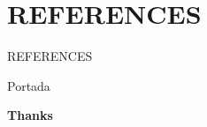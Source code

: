 \nocite{*} %
\section*{REFERENCES}
\begin{frame}[allowframebreaks]{REFERENCES} %
\begingroup %
\renewcommand{\color}[1]{} %
\small{} %

\endgroup %
\end{frame}
\begin{frame} %
	\begin{beamercolorbox}[ht=\paperheight,wd=\paperwidth, center]{Portada}
		\begin{center}\Huge\textbf{Thanks}\end{center} %
		\vspace{0.45\paperheight}
    \end{beamercolorbox}
\end{frame}
